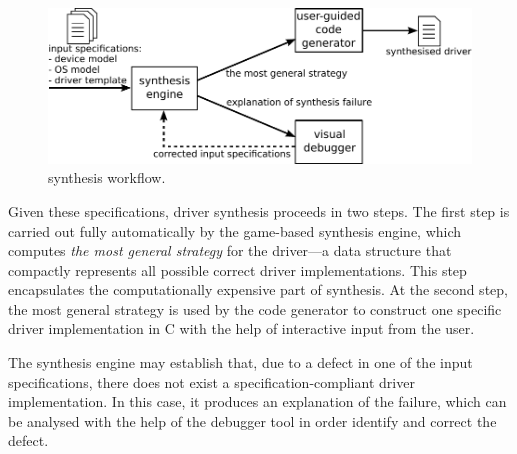 \begin{figure}
    \center
    \includegraphics[width=\linewidth]{imgs/termite.pdf}
    \caption{\termite synthesis workflow.}\label{f:termite}
\end{figure}

Given these specifications, driver synthesis proceeds in two steps.  The first step is carried out fully automatically by the \termite game-based synthesis engine, which computes \emph{the most general strategy} for the driver---a data structure that compactly represents all possible correct driver implementations.  This step encapsulates the computationally expensive part of synthesis.  At the second step, the most general strategy is used by the \termite code generator to construct one specific driver implementation in C with the help of interactive input from the user.

The synthesis engine may establish that, due to a defect in one of the input specifications, there does not exist a specification-compliant driver implementation.  In this case, it produces an explanation of the failure, which can be analysed with the help of the \termite debugger tool in order identify and correct the defect.

        
%
%        
%        

